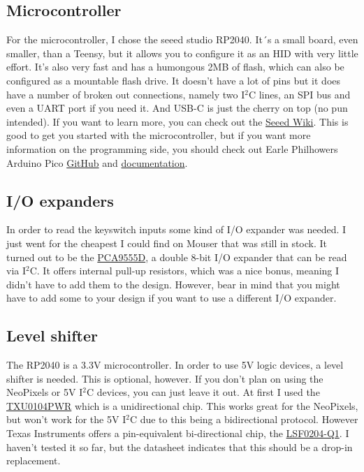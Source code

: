 \documentclass[english, 12pt]{scrartcl}
\begin{document}
	\subsection{Microcontroller}
	For the microcontroller, I chose the seeed studio RP2040. It´s a small board, even smaller, than a Teensy, but it allows you to configure it as an HID with very little effort. It's also very fast and has a humongous 2MB of flash, which can also be configured as a mountable flash drive. It doesn't have a lot of pins but it does have a number of broken out connections, namely two I$^2$C lines, an SPI bus and even a UART port if you need it. And USB-C is just the cherry on top (no pun intended).\newline
	If you want to learn more, you can check out the \href{https://wiki.seeedstudio.com/XIAO-RP2040/}{Seeed Wiki}. This is good to get you started with the microcontroller, but if you want more information on the programming side, you should check out Earle Philhowers Arduino Pico \href{https://github.com/earlephilhower/arduino-pico}{GitHub} and \href{https://arduino-pico.readthedocs.io/en/latest/}{documentation}.
	
	\subsection{I/O expanders}
	In order to read the keyswitch inputs some kind of I/O expander was needed. I just went for the cheapest I could find on Mouser that was still in stock. It turned out to be the \href{https://www.mouser.de/datasheet/2/302/PCA9555-1127545.pdf}{PCA9555D}, a double 8-bit I/O expander that can be read via I$^2$C. It offers internal pull-up resistors, which was a nice bonus, meaning I didn't have to add them to the design. However, bear in mind that you might have to add some to your design if you want to use a different I/O expander.
	
	\subsection{Level shifter}
	The RP2040 is a 3.3V microcontroller. In order to use 5V logic devices, a level shifter is needed. This is optional, however. If you don't plan on using the NeoPixels or 5V I$^2$C devices, you can just leave it out. At first I used the \href{https://www.ti.com/lit/gpn/txu0104}{TXU0104PWR} which is a unidirectional chip. This works great for the NeoPixels, but won't work for the 5V I$^2$C due to this being a bidirectional protocol. However Texas Instruments offers a pin-equivalent bi-directional chip, the \href{https://www.ti.com/lit/gpn/lsf0204-q1}{LSF0204-Q1}. I haven't tested it so far, but the datasheet indicates that this should be a drop-in replacement.
	
\end{document}
